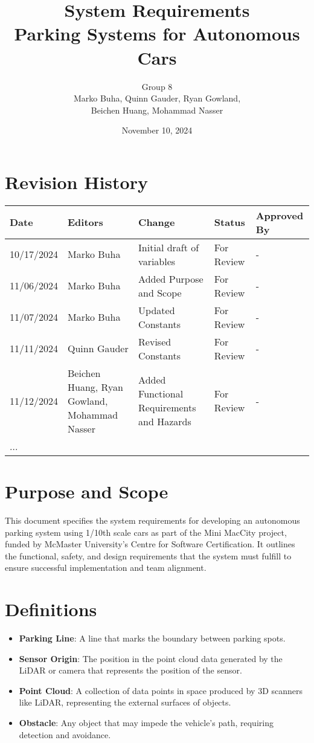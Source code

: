 \documentclass[12pt]{article}
\title{System Requirements\\\vspace{0.5cm}
Parking Systems for Autonomous Cars}
\author{
    Group 8 \\
    Marko Buha, Quinn Gauder, Ryan Gowland,\\
    Beichen Huang, Mohammad Nasser
}
\date{November 10, 2024}
\begin{document}
\maketitle

\tableofcontents
\thispagestyle{empty}
\newpage
\section*{Revision History}

\small %
\begin{longtable}{p{2.5cm}p{3.5cm}p{4cm}p{2.5cm}p{2.5cm}}
\toprule
\textbf{Date} & \textbf{Editors} & \textbf{Change} & \textbf{Status} & \textbf{Approved By} \\
\midrule
10/17/2024 & Marko Buha & Initial draft of variables & For Review & - \\
11/06/2024 & Marko Buha & Added Purpose and Scope & For Review & - \\
11/07/2024 & Marko Buha & Updated Constants & For Review & - \\
11/11/2024 & Quinn Gauder & Revised Constants & For Review & - \\
11/12/2024 & Beichen Huang, Ryan Gowland, \newline Mohammad Nasser & Added Functional Requirements and Hazards & For Review & - \\
... & & & & \\
\bottomrule
\end{longtable}
\normalsize %

\newpage

\section{Purpose and Scope}

This document specifies the system requirements for developing an autonomous parking system using 1/10th scale cars as part of the Mini MacCity project, funded by McMaster University’s Centre for Software Certification. It outlines the functional, safety, and design requirements that the system must fulfill to ensure successful implementation and team alignment.

\section{Definitions}

\begin{itemize}
    \item \textbf{Parking Line}: A line that marks the boundary between parking spots.
    \item \textbf{Sensor Origin}: The position in the point cloud data generated by the LiDAR or camera that represents the position of the sensor.
    \item \textbf{Point Cloud}: A collection of data points in space produced by 3D scanners like LiDAR, representing the external surfaces of objects.
    \item \textbf{Obstacle}: Any object that may impede the vehicle's path, requiring detection and avoidance.
\end{itemize}
\end{document}
